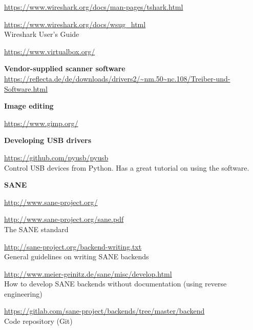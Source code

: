 \documentclass{article}
\begin{document}
\begin{thebibliography}{}
  \url{https://www.wireshark.org/docs/man-pages/tshark.html}
  
  \url{https://www.wireshark.org/docs/wsug_html} \\
  Wireshark User's Guide

  \url{https://www.virtualbox.org/}

  \item[]\hspace{-\labelwidth}\hspace{-\labelsep}\textbf{Vendor-supplied scanner software}
  \url{https://reflecta.de/de/downloads/drivers2/~nm.50~nc.108/Treiber-und-Software.html}

  \item[]\hspace{-\labelwidth}\hspace{-\labelsep}\textbf{Image editing}

  \url{https://www.gimp.org/}

  \item[]\hspace{-\labelwidth}\hspace{-\labelsep}\textbf{Developing USB drivers}

  \url{https://github.com/pyusb/pyusb} \\
  Control USB devices from Python. Has a great tutorial on using the software.
  
  \item[]\hspace{-\labelwidth}\hspace{-\labelsep}\textbf{SANE}
  
  \url{http://www.sane-project.org/}
  
  \url{http://www.sane-project.org/sane.pdf} \\
  The SANE standard
  
  \url{http://sane-project.org/backend-writing.txt} \\
  General guidelines on writing SANE backends
  
  \url{http://www.meier-geinitz.de/sane/misc/develop.html} \\
  How to develop SANE backends without documentation (using reverse engineering)
  
  \url{https://gitlab.com/sane-project/backends/tree/master/backend} \\
  Code repository (Git)
  

\end{thebibliography}
\end{document}
